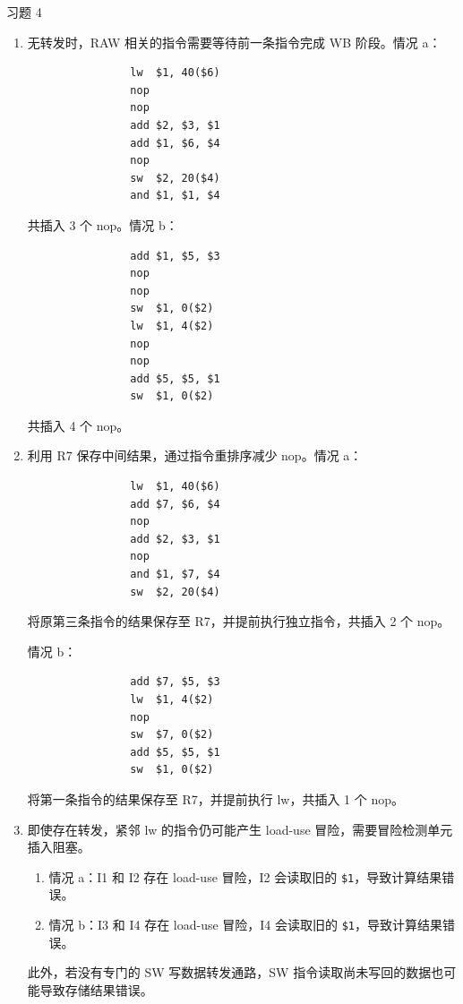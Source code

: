 \begin{problem}
    习题 4
    \begin{solution}
        \begin{enumerate}
            \item[\textbf{1)}] 无转发时，RAW 相关的指令需要等待前一条指令完成 WB 阶段。情况 a：
            \begin{verbatim}
                lw  $1, 40($6)
                nop
                nop
                add $2, $3, $1
                add $1, $6, $4
                nop
                sw  $2, 20($4)
                and $1, $1, $4
            \end{verbatim}
            共插入 3 个 nop。情况 b：
            \begin{verbatim}
                add $1, $5, $3
                nop
                nop
                sw  $1, 0($2)
                lw  $1, 4($2)
                nop
                nop
                add $5, $5, $1
                sw  $1, 0($2)
            \end{verbatim}
            共插入 4 个 nop。

            \item[\textbf{2)}] 利用 R7 保存中间结果，通过指令重排序减少 nop。情况 a：
            \begin{verbatim}
                lw  $1, 40($6)
                add $7, $6, $4
                nop
                add $2, $3, $1
                nop
                and $1, $7, $4
                sw  $2, 20($4)
            \end{verbatim}
            将原第三条指令的结果保存至 R7，并提前执行独立指令，共插入 2 个 nop。

            情况 b：
            \begin{verbatim}
                add $7, $5, $3
                lw  $1, 4($2)
                nop
                sw  $7, 0($2)
                add $5, $5, $1
                sw  $1, 0($2)
            \end{verbatim}
            将第一条指令的结果保存至 R7，并提前执行 lw，共插入 1 个 nop。

            \item[\textbf{3)}] 即使存在转发，紧邻 lw 的指令仍可能产生 load-use 冒险，需要冒险检测单元插入阻塞。
            \begin{enumerate}
                \item 情况 a：I1 和 I2 存在 load-use 冒险，I2 会读取旧的 \texttt{\$1}，导致计算结果错误。
                \item 情况 b：I3 和 I4 存在 load-use 冒险，I4 会读取旧的 \texttt{\$1}，导致计算结果错误。
            \end{enumerate}
            此外，若没有专门的 SW 写数据转发通路，SW 指令读取尚未写回的数据也可能导致存储结果错误。


\end{enumerate}
\end{solution}
\end{problem}
